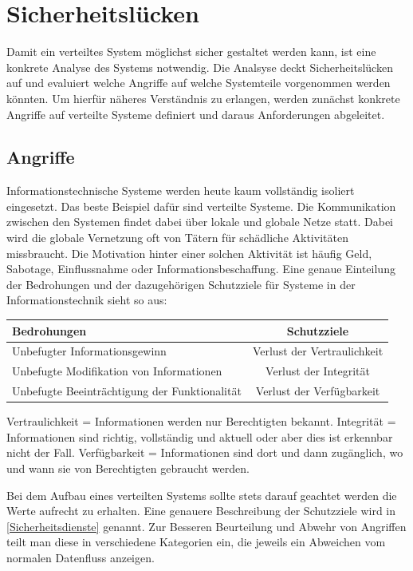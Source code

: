 \documentclass[utf8,biblatex]{lni}
\begin{document}
\section{Sicherheitslücken}\label{Sicherheitsluecken}
Damit ein verteiltes System möglichst sicher gestaltet werden kann, ist eine konkrete Analyse des Systems notwendig. Die Analsyse deckt Sicherheitslücken auf und evaluiert welche Angriffe auf welche Systemteile vorgenommen
werden könnten. Um hierfür näheres Verständnis zu erlangen, werden zunächst konkrete Angriffe auf verteilte Systeme definiert und daraus Anforderungen abgeleitet.

\subsection{Angriffe}

Informationstechnische Systeme werden heute kaum vollständig isoliert eingesetzt. Das beste Beispiel
dafür sind verteilte Systeme. Die Kommunikation zwischen den Systemen findet dabei über lokale und globale 
Netze statt. Dabei wird die globale Vernetzung oft von Tätern für schädliche Aktivitäten missbraucht.
Die Motivation hinter einer solchen Aktivität ist häufig Geld, Sabotage, Einflussnahme oder Informationsbeschaffung. 
Eine genaue Einteilung der Bedrohungen und der dazugehörigen Schutzziele für Systeme in der Informationstechnik sieht so aus:

\begin{tabular}[h]{l|c}
    Bedrohungen & Schutzziele \\
    \hline
    Unbefugter Informationsgewinn & Verlust der Vertraulichkeit \\
    Unbefugte Modifikation von Informationen & Verlust der Integrität \\
    Unbefugte Beeinträchtigung der Funktionalität & Verlust der Verfügbarkeit \\
\end{tabular}


Vertraulichkeit = Informationen werden nur Berechtigten bekannt.
\newline
Integrität = Informationen sind richtig, vollständig und aktuell
oder aber dies ist erkennbar nicht der Fall.
\newline
Verfügbarkeit = Informationen sind dort und dann zugänglich,
wo und wann sie von Berechtigten gebraucht werden.

Bei dem Aufbau eines verteilten Systems sollte stets darauf geachtet werden die Werte 
aufrecht zu erhalten. Eine genauere Beschreibung der Schutzziele wird in \autoref{Sicherheitsdienste} genannt. 
Zur Besseren Beurteilung und Abwehr von Angriffen teilt man diese in verschiedene Kategorien ein,
die jeweils ein Abweichen vom normalen Datenfluss anzeigen.
\end{document}

